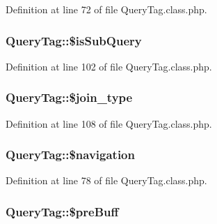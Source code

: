Definition at line 72 of file Query\+Tag.\+class.\+php.

\subsubsection[{\texorpdfstring{\$is\+Sub\+Query}{$isSubQuery}}]{\setlength{\rightskip}{0pt plus 5cm}Query\+Tag\+::\$is\+Sub\+Query}\hypertarget{classQueryTag_ac657cdbbef0ca8f1907197cbf91f1040}{}\label{classQueryTag_ac657cdbbef0ca8f1907197cbf91f1040}


Definition at line 102 of file Query\+Tag.\+class.\+php.

\subsubsection[{\texorpdfstring{\$join\+\_\+type}{$join_type}}]{\setlength{\rightskip}{0pt plus 5cm}Query\+Tag\+::\$join\+\_\+type}\hypertarget{classQueryTag_a8ab11b51470b725b766e2d53bb947ba4}{}\label{classQueryTag_a8ab11b51470b725b766e2d53bb947ba4}


Definition at line 108 of file Query\+Tag.\+class.\+php.

\subsubsection[{\texorpdfstring{\$navigation}{$navigation}}]{\setlength{\rightskip}{0pt plus 5cm}Query\+Tag\+::\$navigation}\hypertarget{classQueryTag_a60f53db40ea035c8e9c88ab2681e3792}{}\label{classQueryTag_a60f53db40ea035c8e9c88ab2681e3792}


Definition at line 78 of file Query\+Tag.\+class.\+php.

\subsubsection[{\texorpdfstring{\$pre\+Buff}{$preBuff}}]{\setlength{\rightskip}{0pt plus 5cm}Query\+Tag\+::\$pre\+Buff}\hypertarget{classQueryTag_ac51df39445e0b132d1fa388c01ebf56d}{}\label{classQueryTag_ac51df39445e0b132d1fa388c01ebf56d}



